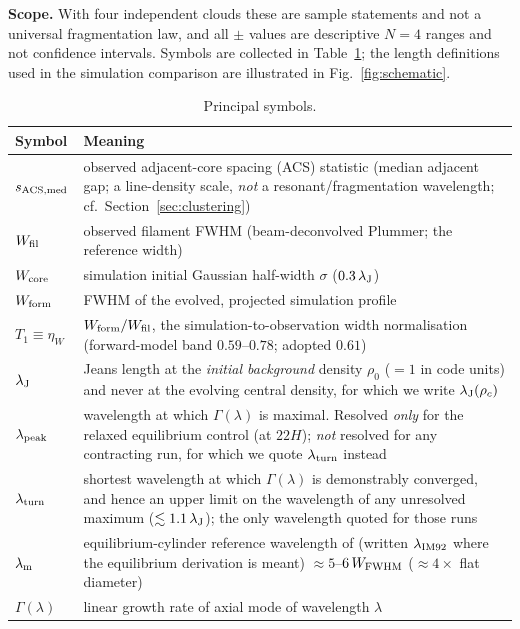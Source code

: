 \documentclass[usenatbib,twoside,twocolumn]{mnras}
\begin{document}
\smallskip\noindent\textbf{Scope.} With four independent clouds these are sample statements and not a universal fragmentation law, and all $\pm$ values are descriptive $N=4$ ranges and not confidence intervals. Symbols are collected in Table~\ref{tab:symbols}; the length definitions used in the simulation comparison are illustrated in Fig.~\ref{fig:schematic}.

\begin{table}
\caption{Principal symbols.}
\label{tab:symbols}
\footnotesize
\setlength{\tabcolsep}{4pt}
\begin{tabular}{lp{6.1cm}}
\toprule
Symbol & Meaning \\
\midrule
$s_{\rm ACS,med}$ & observed adjacent-core spacing (ACS) statistic (median adjacent gap; a line-density scale, \emph{not} a resonant/fragmentation wavelength; cf.\ Section~\ref{sec:clustering}) \\
$W_{\rm fil}$ & observed filament FWHM (beam-deconvolved Plummer; the reference width) \\
$W_{\rm core}$ & simulation initial Gaussian half-width $\sigma$ ($0.3\,\lambda_{\rm J}$) \\
$W_{\rm form}$ & FWHM of the evolved, projected simulation profile \\
$T_1\!\equiv\!\eta_W$ & $W_{\rm form}/W_{\rm fil}$, the simulation-to-observation width normalisation (forward-model band $0.59$--$0.78$; adopted $0.61$) \\
$\lambda_{\rm J}$ & Jeans length at the \emph{initial background} density $\rho_0$ ($=1$ in code units) and never at the evolving central density, for which we write $\lambda_{\rm J}(\rho_c)$ \\
$\lambda_{\rm peak}$ & wavelength at which $\Gamma(\lambda)$ is maximal. Resolved \emph{only} for the relaxed equilibrium control (at $22H$); \emph{not} resolved for any contracting run, for which we quote $\lambda_{\rm turn}$ instead \\
$\lambda_{\rm turn}$ & shortest wavelength at which $\Gamma(\lambda)$ is demonstrably converged, and hence an upper limit on the wavelength of any unresolved maximum ($\lesssim1.1\,\lambda_{\rm J}$); the only wavelength quoted for those runs \\
$\lambda_{\rm m}$ & equilibrium-cylinder reference wavelength of \citet{Inutsuka1992} (written $\lambda_{\rm IM92}$ where the equilibrium derivation is meant) $\approx5$--$6\,W_{\rm FWHM}$ ($\approx4\times$ flat diameter) \\
$\Gamma(\lambda)$ & linear growth rate of axial mode of wavelength $\lambda$ \\

\end{tabular}
\end{table}
\end{document}
